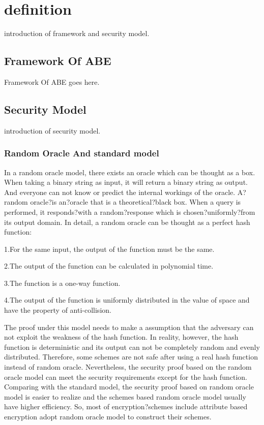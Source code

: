 \section{definition}
introduction of framework and security model.

\subsection{Framework Of ABE}
Framework Of ABE goes here.

\subsection{Security Model}
introduction of security model.

\subsubsection{Random Oracle And standard model}

In a random oracle model, there exists an oracle which can be thought as a box. When taking a binary string as input, it will return a binary string as output. And everyone can not know or predict the internal workings of the oracle. A?random oracle?is an?oracle that is a theoretical?black box. When a query is performed, it responds?with a random?response which is chosen?uniformly?from its output domain. In detail, a random oracle can be thought as a perfect hash function:

1.For the same input, the output of the function must be the same.

2.The output of the function can be calculated in polynomial time.

3.The function is a one-way function.

4.The output of the function is uniformly distributed in the value of space and have the property of anti-collision.

The proof under this model needs to make a assumption that the adversary can not exploit the weakness of the hash function. In reality, however, the hash function is deterministic and its output can not be completely random and evenly distributed. Therefore, some schemes are not safe after using a real hash function instead of random oracle. Nevertheless, the security proof based on the random oracle model can meet the security requirements except for the hash function. Comparing with the standard model, the security proof based on random oracle model is easier to realize and the schemes based random oracle model usually have higher efficiency. So, most of encryption?schemes include attribute based encryption adopt random oracle model to construct their schemes.

